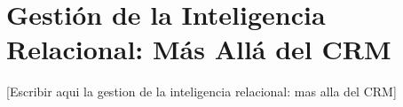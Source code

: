 
\section{Gestión de la Inteligencia Relacional: Más Allá del CRM}

[Escribir aqui la gestion de la inteligencia relacional: mas alla del CRM]
